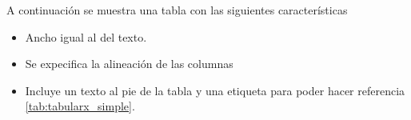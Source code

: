 	A continuación se muestra una tabla con las siguientes características
	\begin{itemize}
		\item Ancho igual al del texto.
		\item Se expecifica la alineación de las columnas
		\item Incluye un texto al pie de la tabla y una etiqueta para poder hacer referencia \ref{tab:tabularx_simple}.
	\end{itemize}
	
%	
%	
%	
	



